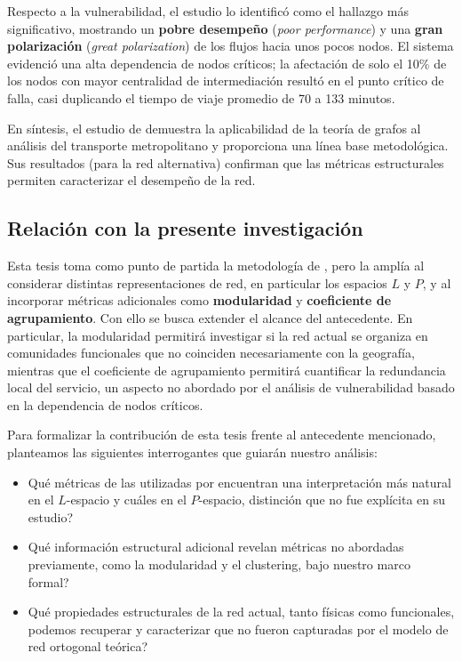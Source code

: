             Respecto a la vulnerabilidad, el estudio lo identificó como el hallazgo más significativo, mostrando un \textbf{pobre desempeño} (\textit{poor performance}) y una \textbf{gran polarización} (\textit{great polarization}) de los flujos hacia unos pocos nodos. El sistema evidenció una alta dependencia de nodos críticos; la afectación de solo el 10\% de los nodos con mayor centralidad de intermediación resultó en el punto crítico de falla, casi duplicando el tiempo de viaje promedio de 70 a 133 minutos.

            En síntesis, el estudio de \cite{barraza2021} demuestra la aplicabilidad de la teoría de grafos al análisis del transporte metropolitano y proporciona una línea base metodológica. Sus resultados (para la red alternativa) confirman que las métricas estructurales permiten caracterizar el desempeño de la red.

        \subsection{Relación con la presente investigación}

            Esta tesis toma como punto de partida la metodología de \cite{barraza2021}, pero la amplía al considerar distintas representaciones de red, en particular los espacios $L$ y $P$, y al incorporar métricas adicionales como \textbf{modularidad} y \textbf{coeficiente de agrupamiento}. Con ello se busca extender el alcance del antecedente. En particular, la modularidad permitirá investigar si la red actual se organiza en comunidades funcionales que no coinciden necesariamente con la geografía, mientras que el coeficiente de agrupamiento permitirá cuantificar la redundancia local del servicio, un aspecto no abordado por el análisis de vulnerabilidad basado en la dependencia de nodos críticos.

            Para formalizar la contribución de esta tesis frente al antecedente mencionado, planteamos las siguientes interrogantes que guiarán nuestro análisis:
            \begin{itemize}
                \item \invquestion{}Qué métricas de las utilizadas por \cite{barraza2021} encuentran una interpretación más natural en el $L$-espacio y cuáles en el $P$-espacio, distinción que no fue explícita en su estudio?
                \item \invquestion{}Qué información estructural adicional revelan métricas no abordadas previamente, como la modularidad y el clustering, bajo nuestro marco formal?
                \item \invquestion{}Qué propiedades estructurales de la red actual, tanto físicas como funcionales, podemos recuperar y caracterizar que no fueron capturadas por el modelo de red ortogonal teórica?
            \end{itemize}

